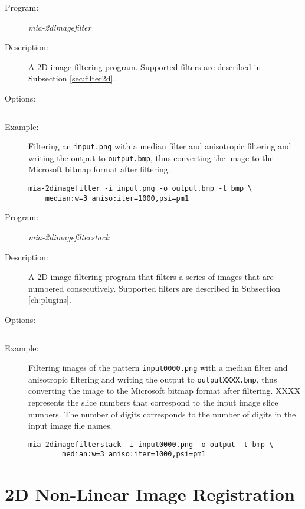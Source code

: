 \begin{description}
\item [Program:]\emph{mia-2dimagefilter}
\item [Description:]A 2D image filtering program. Supported filters are described in Subsection \ref{sec:filter2d}. 
\item [Options:] $\:$

\tabstart
\optinfile
\optoutfile
\opttypetwod
\opthelpplugin
\tabend
\item [Example:] Filtering an \texttt{input.png} with a median filter and anisotropic filtering and writing the output to \texttt{output.bmp}, 
		thus converting the image to the Microsoft bitmap format after filtering. 
\begin{lstlisting}
mia-2dimagefilter -i input.png -o output.bmp -t bmp \
	median:w=3 aniso:iter=1000,psi=pm1
\end{lstlisting}
\end{description}

\begin{description}
\item [Program:]\emph{mia-2dimagefilterstack}
\item [Description:]A 2D image filtering program that filters a series of images that are numbered consecutively. 
              Supported filters are described in Subsection \ref{ch:plugins}. 
\item [Options:] $\:$

\tabstart
\optinfile
\optoutbase
\opttypetwod
\opthelpplugin
\tabend
\item [Example:] Filtering images of the pattern \texttt{input0000.png} with a median filter and anisotropic 
                 filtering and writing the output to \texttt{outputXXXX.bmp}, thus converting the image to the Microsoft 
                 bitmap format after filtering. 
		 XXXX represents the slice numbers that correspond to the input image slice numbers. 
                 The number of digits corresponds to the number of digits in the input image file names. 
\begin{lstlisting}
mia-2dimagefilterstack -i input0000.png -o output -t bmp \
        median:w=3 aniso:iter=1000,psi=pm1
\end{lstlisting}
\end{description}


\section{2D Non-Linear Image Registration}
\label{sec:reg2d}

